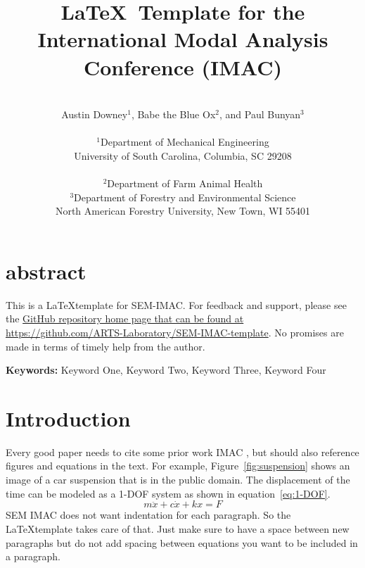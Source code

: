 \documentclass[10pt,letterpaper]{article}
\newcommand{\keywords}[1]{\vspace{2ex} \noindent \textbf{Keywords:} #1}
\begin{document}
\date{} %

\title{\LaTeX\ Template for the International Modal Analysis Conference (IMAC)}

\author{\vspace{.25in}\\
Austin Downey$^1$, Babe the Blue Ox$^2$, and Paul Bunyan$^3$\\ \\ %
 $^1$Department of Mechanical Engineering \\
	University of South Carolina, Columbia, SC 29208 \\ \\ %
 $^2$Department of Farm Animal Health \\
 $^3$Department of Forestry and Environmental Science \\
	North American Forestry University, New Town, WI 55401 \\
}
\maketitle


\section{abstract}
This is a \LaTeX template for SEM-IMAC. For feedback and support, please see the \href{https://github.com/ARTS-Laboratory/SEM-IMAC-template}{GitHub repository home page that can be found at https://github.com/ARTS-Laboratory/SEM-IMAC-template}. No promises are made in terms of timely help from the author. 

\keywords{Keyword One, Keyword Two, Keyword Three, Keyword Four}

\section{Introduction}

Every good paper needs to cite some prior work IMAC \cite{Downey2021OpenVibrations,Ishrat2019RealtimeForecasting,Downey2020Millisecondmodelupdating,Downey2016HighCapacityVariable}, but should also reference figures and equations in the text. For example, Figure~\ref{fig:suspension} shows an image of a car suspension that is in the public domain. The displacement of the time can be modeled as a 1-DOF system as shown in equation~\ref{eq:1-DOF}.
\begin{equation}
m\ddot{x} + c\dot{x} + kx = F
\label{eq:1-DOF}
\end{equation}
SEM IMAC does not want indentation for each paragraph. So the \LaTeX template takes care of that. Just make sure to have a space between new paragraphs but do not add spacing between equations you want to be included in a paragraph. 
\end{document}

